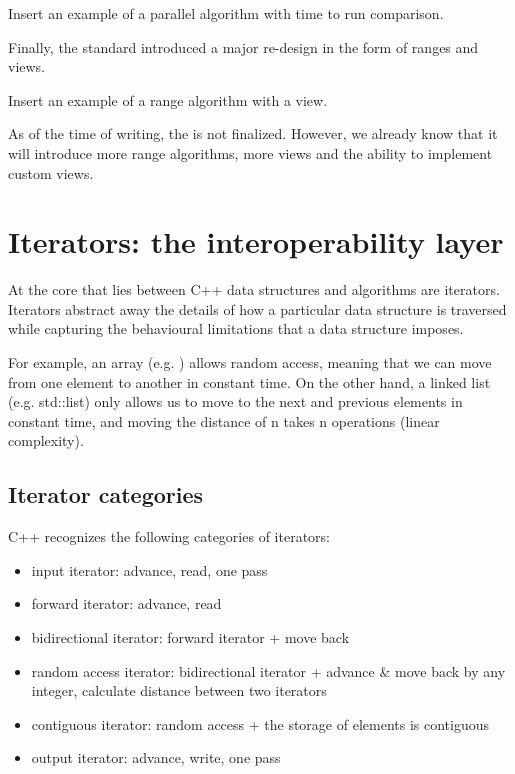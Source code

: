  Insert an example of a parallel algorithm with time to run comparison.

Finally, the  standard introduced a major re-design in the form of ranges and views.

Insert an example of a range algorithm with a view.

As of the time of writing, the  is not finalized. However, we already know that it will introduce more range algorithms, more views and the ability to implement custom views.

\section{Iterators: the interoperability layer}

At the core that lies between C++ data structures and algorithms are iterators. Iterators abstract away the details of how a particular data structure is traversed while capturing the behavioural limitations that a data structure imposes.

For example, an array (e.g. \emph{}) allows random access, meaning that we can move from one element to another in constant time. On the other hand, a linked list (e.g. std::list) only allows us to move to the next and previous elements in constant time, and moving the distance of n takes n operations (linear complexity).

\subsection{Iterator categories}

C++ recognizes the following categories of iterators:

\begin{itemize}
    \item \gls{input iterator}: advance, read, one pass
    \item \gls{forward iterator}: advance, read
    \item \gls{bidirectional iterator}: forward iterator + move back
    \item \gls{random access iterator}: bidirectional iterator + advance \& move back by any integer, calculate distance between two iterators
    \item \gls{contiguous iterator}: random access + the storage of elements is contiguous
    \item \gls{output iterator}: advance, write, one pass
\end{itemize}

